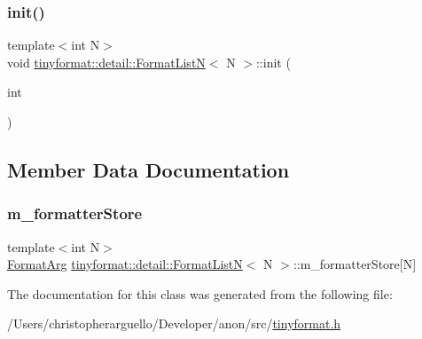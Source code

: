 \subsubsection{\texorpdfstring{init()}{init()}}
{\footnotesize\ttfamily template$<$int N$>$ \\
void \mbox{\hyperlink{classtinyformat_1_1detail_1_1_format_list_n}{tinyformat\+::detail\+::\+Format\+ListN}}$<$ N $>$\+::init (\begin{DoxyParamCaption}\item[{int}]{ }\end{DoxyParamCaption})\hspace{0.3cm}{\ttfamily [inline]}}



\subsection{Member Data Documentation}
\mbox{\label{classtinyformat_1_1detail_1_1_format_list_n_a34d9e64988d50f945f6bbef71429f35f}} 
\subsubsection{\texorpdfstring{m\+\_\+formatter\+Store}{m\_formatterStore}}
{\footnotesize\ttfamily template$<$int N$>$ \\
\mbox{\hyperlink{classtinyformat_1_1detail_1_1_format_arg}{Format\+Arg}} \mbox{\hyperlink{classtinyformat_1_1detail_1_1_format_list_n}{tinyformat\+::detail\+::\+Format\+ListN}}$<$ N $>$\+::m\+\_\+formatter\+Store\mbox{[}N\mbox{]}\hspace{0.3cm}{\ttfamily [private]}}



The documentation for this class was generated from the following file\+:\begin{DoxyCompactItemize}
\item 
/\+Users/christopherarguello/\+Developer/anon/src/\mbox{\hyperlink{tinyformat_8h}{tinyformat.\+h}}\end{DoxyCompactItemize}
